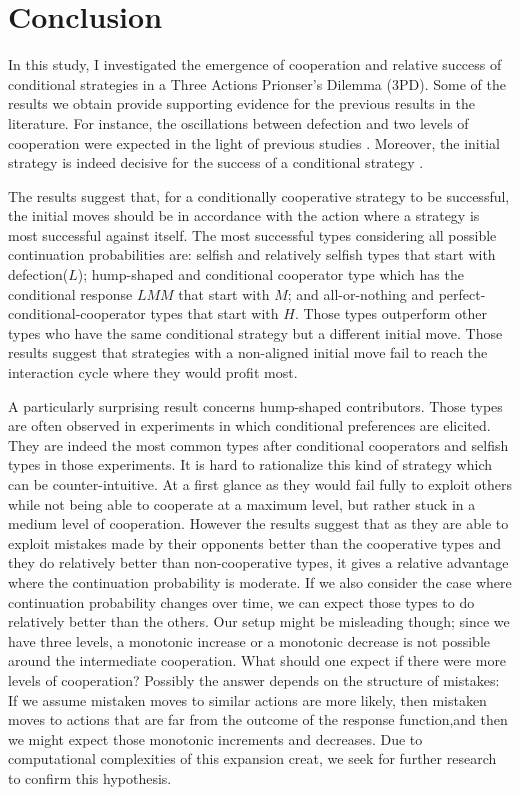 \documentclass[12pt]{article}
\begin{document}
\section*{Conclusion}
 
In this study, I investigated the emergence of cooperation and relative success of conditional strategies in a Three Actions Prionser's Dilemma (3PD). Some of the results we obtain provide supporting evidence for the previous results in the literature. For instance, the oscillations between defection and two levels of cooperation were expected in the light of previous studies \citep{Wahl1999-nn, Nowak1989-vx, Bendor1995-zf, Imhof2005-ti, Van_Veelen2012-xf, Garcia2016-tr, Van_Veelen2012-xf}. Moreover, the initial strategy is indeed decisive for the success of a conditional strategy \citep{Wahl1999-zi, Wahl1999-nn}. 

The results suggest that, for a conditionally cooperative strategy to be successful, the initial moves should be in accordance with the action where a strategy is most successful against itself. The most successful types considering all possible continuation probabilities are: selfish and relatively selfish types that start with defection($L$); hump-shaped and conditional cooperator type which has the conditional response $LMM$ that start with $M$; and all-or-nothing and perfect-conditional-cooperator types that start with $H$. Those types outperform other types who have the same conditional strategy but a different initial move. Those results suggest that strategies with a non-aligned initial move fail to reach the interaction cycle where they would profit most. 

A particularly surprising result concerns hump-shaped contributors. Those types are often observed in experiments in which conditional preferences are elicited. They are indeed the most common types after conditional cooperators and selfish types in those experiments. It is hard to rationalize this kind of strategy which can be counter-intuitive. At a first glance as they would fail fully to exploit others while not being able to cooperate at a maximum level,  but rather stuck in a medium level of cooperation. However the results suggest that as they are able to exploit mistakes made by their opponents better than the cooperative types and they do relatively better than non-cooperative types, it gives a relative advantage where the continuation probability is moderate. If we also consider the case where continuation probability changes over time, we can expect those types to do relatively better than the others. Our setup might be misleading though; since we have three levels, a monotonic increase or a monotonic decrease is not possible around the intermediate cooperation. What should one expect if there were more levels of cooperation? Possibly the answer depends on the structure of mistakes: If we assume mistaken moves to similar actions are more likely, then mistaken moves to actions that are far from the outcome of the response function,and then we might expect those monotonic increments and decreases. Due to computational complexities of this expansion creat, we seek for further research to confirm this hypothesis. 
\end{document}
